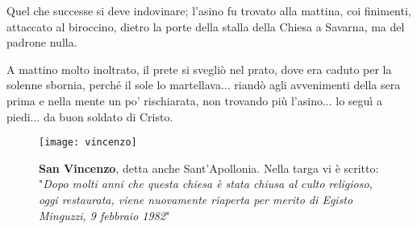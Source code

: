 Quel che successe si deve indovinare; l'asino fu trovato alla mattina, coi finimenti, attaccato al biroccino, dietro la porte della stalla della Chiesa a Savarna, ma del padrone nulla.

A mattino molto inoltrato, il prete si svegliò nel prato, dove era caduto per la solenne sbornia, perché il sole lo martellava... riandò agli avvenimenti della sera prima e nella mente un po' rischiarata, non trovando più l'asino... lo seguì a piedi... da buon soldato di Cristo.



 \begin{figure}[htb]
    \centering
    \texttt{[image: vincenzo]}
    \caption*{\textbf{San Vincenzo}, detta anche Sant'Apollonia. Nella targa vi è scritto:\\ "\textit{Dopo molti anni che questa chiesa è stata chiusa al culto religioso, oggi restaurata, viene nuovamente riaperta per merito di Egisto Minguzzi, 9 febbraio 1982}"\label{fig:vincenzo}}
\end{figure}










































%

